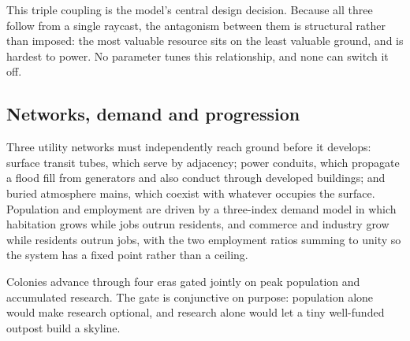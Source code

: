 This triple coupling is the model's central design decision. Because all three
follow from a single raycast, the antagonism between them is structural rather
than imposed: the most valuable resource sits on the least valuable ground, and
is hardest to power. No parameter tunes this relationship, and none can switch
it off.

\subsection{Networks, demand and progression}

Three utility networks must independently reach ground before it develops:
surface transit tubes, which serve by adjacency; power conduits, which
propagate a flood fill from generators and also conduct through developed
buildings; and buried atmosphere mains, which coexist with whatever occupies
the surface. Population and employment are driven by a three-index demand
model in which habitation grows while jobs outrun residents, and commerce and
industry grow while residents outrun jobs, with the two employment ratios
summing to unity so the system has a fixed point rather than a ceiling.

Colonies advance through four eras gated jointly on peak population and
accumulated research. The gate is conjunctive on purpose: population alone
would make research optional, and research alone would let a tiny well-funded
outpost build a skyline.
